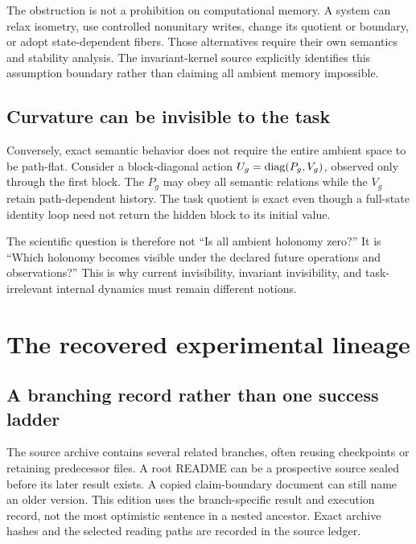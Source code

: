 \documentclass[11pt]{article}
\begin{document}
The obstruction is not a prohibition on computational memory. A system can relax isometry, use controlled nonunitary writes, change its quotient or boundary, or adopt state-dependent fibers. Those alternatives require their own semantics and stability analysis. The invariant-kernel source explicitly identifies this assumption boundary rather than claiming all ambient memory impossible. \cite{nik}

\subsection{Curvature can be invisible to the task}
Conversely, exact semantic behavior does not require the entire ambient space to be path-flat. Consider a block-diagonal action \(U_g=\operatorname{diag}(P_g,V_g)\), observed only through the first block. The \(P_g\) may obey all semantic relations while the \(V_g\) retain path-dependent history. The task quotient is exact even though a full-state identity loop need not return the hidden block to its initial value.

The scientific question is therefore not ``Is all ambient holonomy zero?'' It is ``Which holonomy becomes visible under the declared future operations and observations?'' This is why current invisibility, invariant invisibility, and task-irrelevant internal dynamics must remain different notions.

\section{The recovered experimental lineage}
\subsection{A branching record rather than one success ladder}
The source archive contains several related branches, often reusing checkpoints or retaining predecessor files. A root README can be a prospective source sealed before its later result exists. A copied claim-boundary document can still name an older version. This edition uses the branch-specific result and execution record, not the most optimistic sentence in a nested ancestor. Exact archive hashes and the selected reading paths are recorded in the source ledger.
\end{document}
